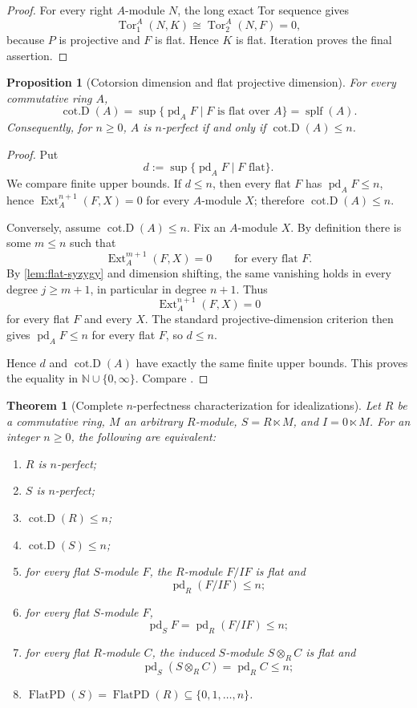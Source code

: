 \documentclass[11pt,reqno]{amsart}
\newcommand{\pd}{\operatorname{pd}}
\newcommand{\cotD}{\operatorname{cot.D}}
\newcommand{\Tor}{\operatorname{Tor}}
\newcommand{\Ext}{\operatorname{Ext}}
\newcommand{\splf}{\operatorname{splf}}
\newcommand{\FlatPD}{\operatorname{FlatPD}}
\theoremstyle{plain}
\newtheorem{theorem}{Theorem}[section]
\newtheorem{proposition}[proposition]{Proposition}
\theoremstyle{definition}
\theoremstyle{remark}
\begin{document}
\begin{proof}
For every right $A$-module $N$, the long exact Tor sequence gives
\[
 \Tor_1^A(N,K)\cong \Tor_2^A(N,F)=0,
\]
because $P$ is projective and $F$ is flat.  Hence $K$ is flat.  Iteration proves
the final assertion.
\end{proof}

\begin{proposition}[Cotorsion dimension and flat projective dimension]\label{prop:cot-splf}
For every commutative ring $A$,
\[
  \cotD(A)=\sup\{\pd_AF\mid F\text{ is flat over }A\}=\splf(A).
\]
Consequently, for $n\ge0$, $A$ is $n$-perfect if and only if
$\cotD(A)\le n$.
\end{proposition}

\begin{proof}
Put
\[
 d:=\sup\{\pd_AF\mid F\text{ flat}\}.
\]
We compare finite upper bounds.  If $d\le n$, then every flat $F$ has
$\pd_AF\le n$, hence $\Ext_A^{n+1}(F,X)=0$ for every $A$-module $X$; therefore
$\cotD(A)\le n$.

Conversely, assume $\cotD(A)\le n$.  Fix an $A$-module $X$.  By definition there
is some $m\le n$ such that
\[
 \Ext_A^{m+1}(F,X)=0
 \qquad\text{for every flat }F.
\]
By \cref{lem:flat-syzygy} and dimension shifting, the same vanishing holds in
every degree $j\ge m+1$, in particular in degree $n+1$.  Thus
\[
 \Ext_A^{n+1}(F,X)=0
\]
for every flat $F$ and every $X$.  The standard projective-dimension criterion
then gives $\pd_AF\le n$ for every flat $F$, so $d\le n$.

Hence $d$ and $\cotD(A)$ have exactly the same finite upper bounds.  This proves
the equality in $\mathbb N\cup\{0,\infty\}$.  Compare
\cite{MaoDing2006,BennisMahdou2009}.
\end{proof}

\begin{theorem}[Complete $n$-perfectness characterization for idealizations]\label{thm:equiv}
Let $R$ be a commutative ring, $M$ an arbitrary $R$-module,
$S=R\ltimes M$, and $I=0\ltimes M$.  For an integer $n\ge0$, the following are
equivalent:
\begin{enumerate}[label=\textup{(\roman*)}]
\item $R$ is $n$-perfect;
\item $S$ is $n$-perfect;
\item $\cotD(R)\le n$;
\item $\cotD(S)\le n$;
\item for every flat $S$-module $F$, the $R$-module $F/IF$ is flat and
      \[
        \pd_R(F/IF)\le n;
      \]
\item for every flat $S$-module $F$,
      \[
        \pd_SF=\pd_R(F/IF)\le n;
      \]
\item for every flat $R$-module $C$, the induced $S$-module $S\otimes_RC$ is flat
      and
      \[
        \pd_S(S\otimes_RC)=\pd_RC\le n;
      \]
\item $\FlatPD(S)=\FlatPD(R)\subseteq\{0,1,\dots,n\}$.
\end{enumerate}
\end{theorem}
\end{document}
